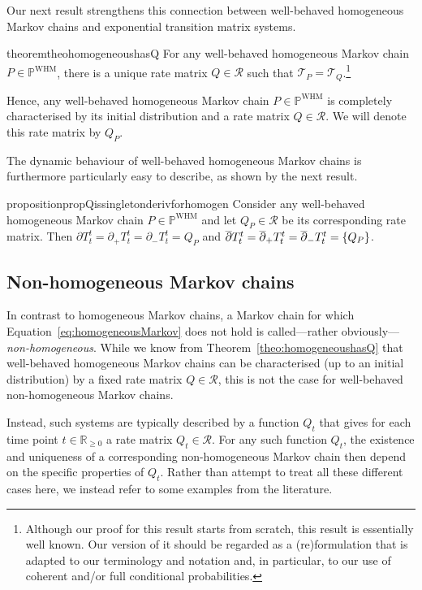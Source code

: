 \documentclass[10pt,a4paper]{paper}
\theoremstyle{definition}
\newcommand{\reals}{\mathbb{R}}
\newcommand{\realsnonneg}{\reals_{\geq 0}}
\newcommand{\processes}{\mathbb{P}}
\newcommand{\whmprocesses}{\processes^{\mathrm{WHM}}}
\begin{document}
Our next result strengthens this connection between well-behaved homogeneous Markov chains and exponential transition matrix systems.

\begin{restatable}{theorem}{theohomogeneoushasQ}
\label{theo:homogeneoushasQ}
For any well-behaved homogeneous Markov chain $P\in\whmprocesses$, there is a unique rate matrix $Q\in\mathcal{R}$ such that $\mathcal{T}_P=\mathcal{T}_Q$.\footnote{Although our proof for this result starts from scratch, this result is essentially well known. Our version of it should be regarded as a (re)formulation that is adapted to our terminology and notation and, in particular, to our use of coherent and/or full conditional probabilities.}
\end{restatable}

Hence, any well-behaved homogeneous Markov chain $P\in\whmprocesses$ is completely characterised by its initial distribution and a rate matrix $Q\in\mathcal{R}$. We will denote this rate matrix by $Q_P$.


The dynamic behaviour of well-behaved homogeneous Markov chains is furthermore particularly easy to describe, as shown by the next result.
\begin{restatable}{proposition}{propQissingletonderivforhomogen}
\label{prop:Q_is_singleton_deriv_for_homogen}
Consider any well-behaved homogeneous Markov chain $P\in\whmprocesses$ and let $Q_P\in\mathcal{R}$ be its corresponding rate matrix. Then $\partial T_t^t=\partial_+T_t^t=\partial_-T_t^t=Q_P$ and $\smash{\overline{\partial}}T_t^t=\smash{\overline{\partial}_+}T_t^t=\smash{\overline{\partial}_-}T_t^t=\{Q_P\}$.
\end{restatable}

\subsection{Non-homogeneous Markov chains}\label{sec:nonhomogen_markov}

In contrast to homogeneous Markov chains, a Markov chain for which Equation~\eqref{eq:homogeneousMarkov} does not hold is called---rather obviously---\emph{non-homogeneous}. While we know from Theorem~\ref{theo:homogeneoushasQ} that well-behaved homogeneous Markov chains can be characterised (up to an initial distribution) by a fixed rate matrix $Q\in\mathcal{R}$, this is not the case for well-behaved non-homogeneous Markov chains. 

Instead, such systems are typically described by a function $Q_t$ that gives for each time point $t\in\realsnonneg$ a rate matrix $Q_t\in\mathcal{R}$. For any such function $Q_t$, the existence and uniqueness of a corresponding non-homogeneous Markov chain then depend on the specific properties of $Q_t$. Rather than attempt to treat all these different cases here, we instead refer to some examples from the literature. 
\end{document}
